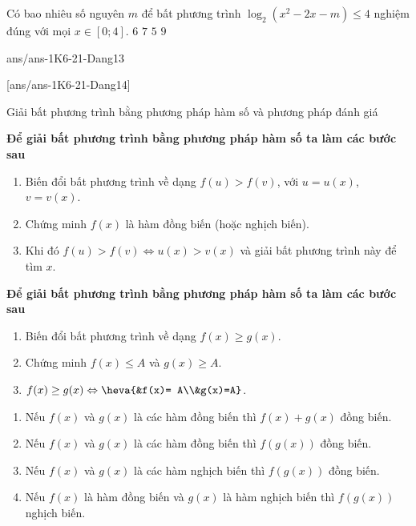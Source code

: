 \begin{ex}%
	Có bao nhiêu số nguyên $m$ để bất phương trình ${{\log }_2}\left( {x^2}-2x-m \right)\le 4$ nghiệm đúng với mọi $x\in \left[ 0;4 \right]$.
	\choice
	{ $6$}
	{\True $7$}
	{ $5$}
	{ $9$}
\end{ex}
\begin{indapan}{10}
	{ans/ans-1K6-21-Dang13}
\end{indapan}
[ans/ans-1K6-21-Dang14]
\begin{dang}{Giải bất phương trình bằng phương pháp hàm số và phương pháp đánh giá}%
	
	\textbf{Để giải bất phương trình bằng phương pháp hàm số ta làm các bước sau}
	\begin{enumerate}
		\item Biến đổi bất phương trình về dạng $f(u)>f(v)$, với $u=u(x)$, $v=v(x)$.
		\item  Chứng minh $f(x)$ là hàm đồng biến (hoặc nghịch biến).
		\item  Khi đó  $f(u)>f(v)\Leftrightarrow u(x)>v(x)$ và giải bất phương trình này để tìm $x$.
	\end{enumerate}
	\textbf{Để giải bất phương trình bằng phương pháp hàm số ta làm các bước sau}
	\begin{enumerate}
		\item Biến đổi bất phương trình về dạng $f(x)\geq g(x)$.
		\item  Chứng minh $f(x)\leq A$ và $g(x)\geq A$.
		\item  $f(x)\geq g(x) \Leftrightarrow \heva{&f(x)= A\\&g(x)=A}$.
	\end{enumerate}
	\begin{note} 
		\begin{enumerate}
			\item Nếu $f(x)$ và $g(x)$ là các hàm đồng biến thì $f(x)+g(x)$ đồng biến.
			\item Nếu $f(x)$ và $g(x)$ là các hàm đồng biến thì $f(g(x))$ đồng biến.
			\item Nếu $f(x)$ và $g(x)$ là các hàm nghịch biến thì $f(g(x))$ đồng biến.
			\item Nếu $f(x)$ là hàm đồng biến và $g(x)$ là  hàm nghịch biến thì $f(g(x))$ nghịch biến.
		\end{enumerate}
	\end{note}
\end{dang}
